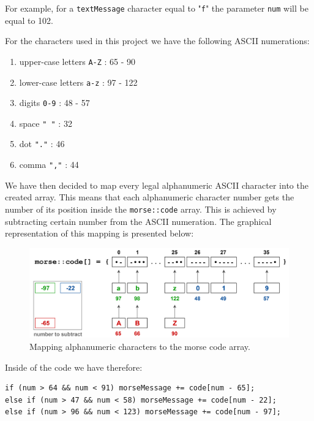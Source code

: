 \documentclass[12pt]{report}
\begin{document}
For example, for a \verb|textMessage| character equal to "\verb|f|" the parameter \verb|num| will be equal to 102.

For the characters used in this project we have the following ASCII numerations:


\begin{enumerate}

\item upper-case letters \verb|A-Z| : 65 - 90

\item lower-case letters \verb|a-z| : 97 - 122

\item digits \verb|0-9| : 48 - 57

\item space \verb|" "| : 32

\item dot \verb|"."| : 46

\item comma \verb|","| : 44

\end{enumerate}


We have then decided to map every legal alphanumeric ASCII character into the created array. This means that each alphanumeric character number gets the number of its position inside the \verb|morse::code| array. This is achieved by subtracting certain number from the ASCII numeration. The graphical representation of this mapping is presented below:

\begin{figure}[H]
\centering\includegraphics[scale=0.1]{morse_code_map}
\caption{Mapping alphanumeric characters to the morse code array.}				
\label{fig:morse_code_map}
\end{figure}

Inside of the code we have therefore:

\begin{snugshade}
\begin{verbatim}
if (num > 64 && num < 91) morseMessage += code[num - 65];
else if (num > 47 && num < 58) morseMessage += code[num - 22];
else if (num > 96 && num < 123) morseMessage += code[num - 97];
\end{verbatim}
\end{snugshade}
\end{document}
